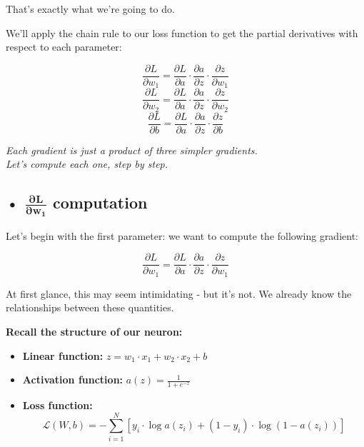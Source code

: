 \documentclass[11pt]{article}
\begin{document}
That's exactly what we're going to do.

\vspace{1em}

We'll apply the chain rule to our loss function to get the partial derivatives with respect to each parameter:

\[
\frac{\partial L}{\partial w_1} = \frac{\partial L}{\partial a} \cdot \frac{\partial a}{\partial z} \cdot \frac{\partial z}{\partial w_1}
\]
\[
\frac{\partial L}{\partial w_2} = \frac{\partial L}{\partial a} \cdot \frac{\partial a}{\partial z} \cdot \frac{\partial z}{\partial w_2}
\]
\[
\frac{\partial L}{\partial b} = \frac{\partial L}{\partial a} \cdot \frac{\partial a}{\partial z} \cdot \frac{\partial z}{\partial b}
\]

\vspace{1em}

\begin{tcolorbox}[colback=gray!10, colframe=gray!40!black, boxrule=0.3mm]
\centering
\textit{Each gradient is just a product of three simpler gradients.}\\
\textit{Let's compute each one, step by step.}
\end{tcolorbox}


\subsection*{• $\boldsymbol{\frac{\partial L}{\partial w_1}}$ computation}

Let's begin with the first parameter:  
we want to compute the following gradient:

\[
\frac{\partial L}{\partial w_1} = \frac{\partial L}{\partial a} \cdot \frac{\partial a}{\partial z} \cdot \frac{\partial z}{\partial w_1}
\]

\vspace{0.5em}

At first glance, this may seem intimidating - but it's not.  
We already know the relationships between these quantities.

\vspace{1em}

\begin{tcolorbox}[colback=gray!5, colframe=gray!50!black, boxrule=0.3mm]
\textbf{Recall the structure of our neuron:}
\begin{itemize}
    \item \textbf{Linear function:} $z = w_1 \cdot x_1 + w_2 \cdot x_2 + b$
    \item \textbf{Activation function:} $a(z) = \frac{1}{1 + e^{-z}}$
    \item \textbf{Loss function:}  
    \[
    \mathcal{L}(W, b) = - \sum_{i=1}^{N} \left[ y_i \cdot \log a(z_i) + (1 - y_i) \cdot \log(1 - a(z_i)) \right]
    \]
\end{itemize}
\end{tcolorbox}
\end{document}
